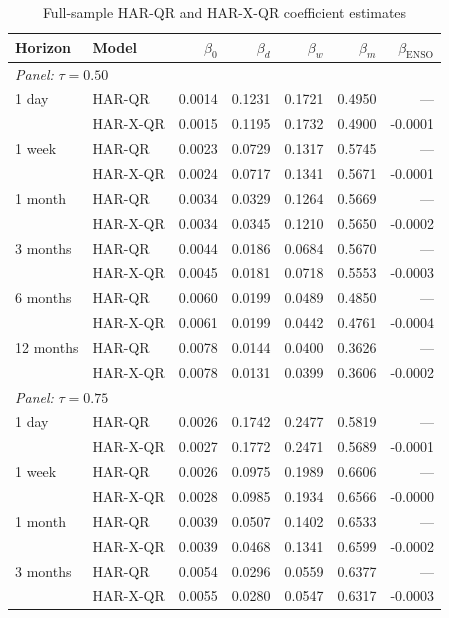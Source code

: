 \begin{table}[htbp]
\centering
\small
\caption{Full-sample HAR-QR and HAR-X-QR coefficient estimates}
\label{tab:har-qr-coefficients}
\begin{tabular}{llrrrrr}
\toprule
Horizon & Model & $\beta_0$ & $\beta_d$ & $\beta_w$ & $\beta_m$ & $\beta_{\text{ENSO}}$ \\
\midrule
\multicolumn{7}{l}{\textit{Panel: } $\tau = 0.50$} \\
\midrule
1 day & HAR-QR & 0.0014 & 0.1231 & 0.1721 & 0.4950 & --- \\
 & HAR-X-QR & 0.0015 & 0.1195 & 0.1732 & 0.4900 & -0.0001 \\
1 week & HAR-QR & 0.0023 & 0.0729 & 0.1317 & 0.5745 & --- \\
 & HAR-X-QR & 0.0024 & 0.0717 & 0.1341 & 0.5671 & -0.0001 \\
1 month & HAR-QR & 0.0034 & 0.0329 & 0.1264 & 0.5669 & --- \\
 & HAR-X-QR & 0.0034 & 0.0345 & 0.1210 & 0.5650 & -0.0002 \\
3 months & HAR-QR & 0.0044 & 0.0186 & 0.0684 & 0.5670 & --- \\
 & HAR-X-QR & 0.0045 & 0.0181 & 0.0718 & 0.5553 & -0.0003 \\
6 months & HAR-QR & 0.0060 & 0.0199 & 0.0489 & 0.4850 & --- \\
 & HAR-X-QR & 0.0061 & 0.0199 & 0.0442 & 0.4761 & -0.0004 \\
12 months & HAR-QR & 0.0078 & 0.0144 & 0.0400 & 0.3626 & --- \\
 & HAR-X-QR & 0.0078 & 0.0131 & 0.0399 & 0.3606 & -0.0002 \\
\midrule
\multicolumn{7}{l}{\textit{Panel: } $\tau = 0.75$} \\
\midrule
1 day & HAR-QR & 0.0026 & 0.1742 & 0.2477 & 0.5819 & --- \\
 & HAR-X-QR & 0.0027 & 0.1772 & 0.2471 & 0.5689 & -0.0001 \\
1 week & HAR-QR & 0.0026 & 0.0975 & 0.1989 & 0.6606 & --- \\
 & HAR-X-QR & 0.0028 & 0.0985 & 0.1934 & 0.6566 & -0.0000 \\
1 month & HAR-QR & 0.0039 & 0.0507 & 0.1402 & 0.6533 & --- \\
 & HAR-X-QR & 0.0039 & 0.0468 & 0.1341 & 0.6599 & -0.0002 \\
3 months & HAR-QR & 0.0054 & 0.0296 & 0.0559 & 0.6377 & --- \\
 & HAR-X-QR & 0.0055 & 0.0280 & 0.0547 & 0.6317 & -0.0003 \\

\end{tabular}
\end{table}
